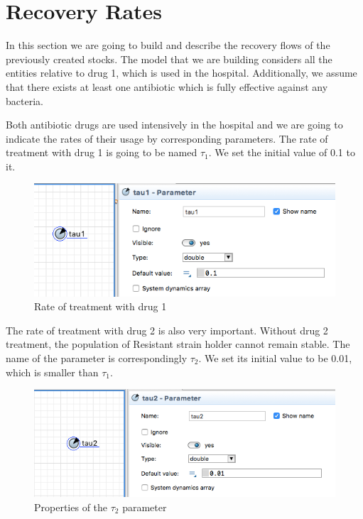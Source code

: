 \section{Recovery Rates}

In this section we are going to build and describe the recovery flows of the previously created stocks. The model that we are building considers all the entities relative to drug 1, which is used in the hospital. Additionally, we assume that there exists at least one antibiotic which is fully effective against any bacteria.

Both antibiotic drugs are used intensively in the hospital and we are going to indicate the rates of their usage by corresponding parameters. The rate of treatment with drug 1 is going to be named $\tau_1$. We set the initial value of 0.1 to it.

\begin{figure}[H]
  \centering
  \includegraphics[height=0.3\textwidth]{img/screens/recovery/recovery1}
  \caption{Rate of treatment with drug 1}
\end{figure}

The rate of treatment with drug 2 is also very important. Without drug 2 treatment, the population of Resistant strain holder cannot remain stable. The name of the parameter is correspondingly $\tau_2$. We set its initial value to be 0.01, which is smaller than $\tau_1$.

\begin{figure}[H]
  \centering
  \includegraphics[height=0.3\textwidth]{img/screens/recovery/recovery2}
  \caption{Properties of the $\tau_2$ parameter}
\end{figure}

